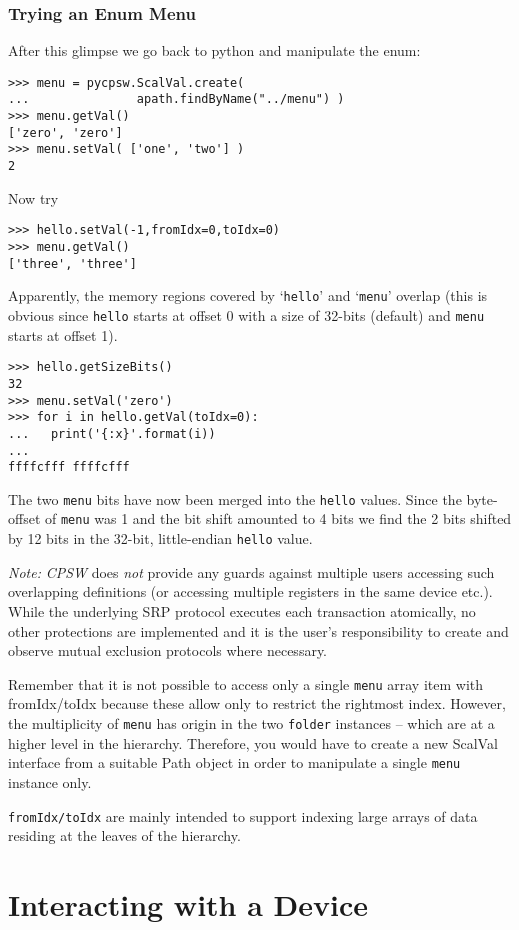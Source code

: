 \documentclass[10pt]{article}
\newcommand{\ita}[1]{\emph{#1}}
\newcommand{\cpsw}      {\ita {CPSW}}
\newcommand{\Path}      {{Path}}
\newcommand{\py}        {python}
\newcommand{\cod}[1] {{\tt#1}}
\begin{document}
\subsubsection{Trying an Enum Menu}
After this glimpse we go back to \py{} and manipulate the enum:
\begin{verbatim}
>>> menu = pycpsw.ScalVal.create(
...               apath.findByName("../menu") )
>>> menu.getVal()
['zero', 'zero']
>>> menu.setVal( ['one', 'two'] )
2
\end{verbatim}
Now try
\begin{verbatim}
>>> hello.setVal(-1,fromIdx=0,toIdx=0)
>>> menu.getVal()
['three', 'three']
\end{verbatim}
Apparently, the memory regions covered by `\cod{hello}' and `\cod{menu}' overlap (this is
obvious since \cod{hello} starts at offset 0 with a size of 32-bits (default)
and \cod{menu} starts at offset 1).
\begin{verbatim}
>>> hello.getSizeBits()
32
>>> menu.setVal('zero')
>>> for i in hello.getVal(toIdx=0):
...   print('{:x}'.format(i))
...
ffffcfff ffffcfff
\end{verbatim}
The two \cod{menu} bits have now been merged into the \cod{hello} values.
Since the byte-offset of \cod{menu} was 1 and the bit shift amounted to 4 bits
we find the 2 bits shifted by 12 bits in the 32-bit, little-endian
\cod{hello} value.

{\em Note:} \cpsw{} does {\em not} provide any guards against multiple users
accessing such overlapping definitions (or accessing multiple registers in the
same device etc.). While the underlying SRP protocol executes each transaction
atomically, no other protections are implemented and it is the user's responsibility
to create and observe mutual exclusion protocols where necessary.

Remember that it is not possible to access only a single \cod{menu} array item
with fromIdx/toIdx because these allow only to restrict the rightmost index.
However, the multiplicity of \cod{menu} has origin in the two \cod{folder} instances
-- which are at a higher level in the hierarchy. Therefore, you would have to create a
new ScalVal interface from a suitable \Path{} object in order to manipulate
a single \cod{menu} instance only.

\cod{fromIdx/toIdx} are mainly intended to support indexing large arrays of data
residing at the leaves of the hierarchy.

\section{Interacting with a Device}
\end{document}
